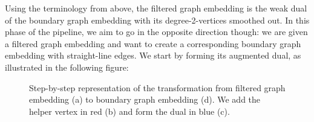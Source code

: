 Using the terminology from above, the filtered graph embedding is the weak dual of the boundary graph embedding with its degree-2-vertices smoothed out. In this phase of the pipeline, we aim to go in the opposite direction though: we are given a filtered graph embedding and want to create a corresponding boundary graph embedding with straight-line edges. We start by forming its augmented dual, as illustrated in the following figure:

\begin{figure}[H]
	\centering
	\caption{Step-by-step representation of the transformation from filtered graph embedding (a) to boundary graph embedding (d). We add the helper vertex in red (b) and form the dual in blue (c).}
	\label{fig:transformation}
\end{figure}

